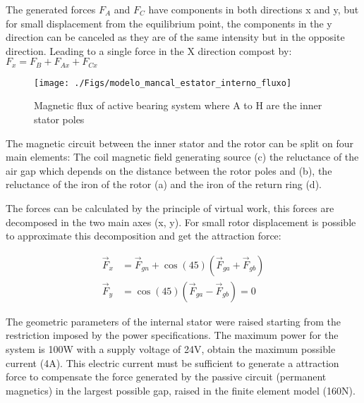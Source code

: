 \documentclass[10pt,fleqn,a4paper,twoside]{article}
\begin{document}
	The generated forces $F_A$ and $F_C$  have components in both directions x and y, but for small displacement from the equilibrium point, the components in the y direction can be canceled as they are of the same intensity but in the opposite direction. Leading to a single force in the X direction compost by: $F_x = F_B + F_{Ax} + F_{Cx}$
	
	\begin{figure}[ht]
		\centering
		\texttt{[image: ./Figs/modelo\_mancal\_estator\_interno\_fluxo]}
		\caption{Magnetic flux of active bearing system where A to H are the inner stator poles}
		\label{fig:modelo:mancal:estator:interno:fluxo}
	\end{figure}
	
	The magnetic circuit between the inner stator and the rotor can be split on four main elements: The coil magnetic field generating source (c) the reluctance of the air gap which depends on the distance between the rotor poles and (b), the reluctance of the iron of the rotor (a) and the iron of the return ring (d).
	
	
	
	The forces can be calculated by the principle of virtual work, this forces are decomposed in the two main axes (x, y). For small rotor displacement is possible to approximate this decomposition and get the attraction force: 
	
	\begin{align}
		\vec{F}_x &= \vec{F}_{gn} + \cos(45) (\vec{F}_{ga} + \vec{F}_{gb}) \label{eq:ativo:F:resultante:y} \\
		\vec{F}_y &=  \cos(45) (\vec{F}_{ga} - \vec{F}_{gb}) = 0 \label{eq:ativo:F:resultante:x}
	\end{align}
	
	The geometric parameters of the internal stator were raised starting from the restriction imposed by the power specifications. The maximum power for the system is 100W with a  supply voltage of 24V, obtain the maximum possible current  (4A). This electric current must be sufficient to generate a attraction force to compensate the force generated by the passive circuit (permanent magnetics) in the largest  possible gap, raised in the finite element model (160N).
	
\end{document}
